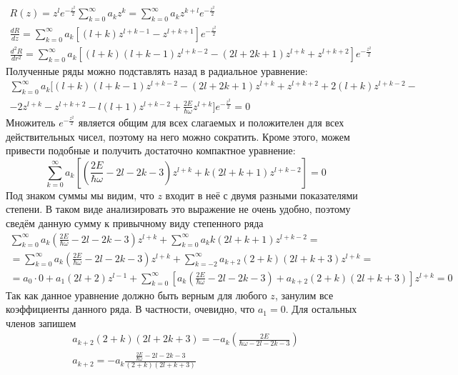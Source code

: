 \begin{gather*}
    R(z) = z^l e^{-\frac{z^2}{2}}\sum_{k=0}^\infty a_k z^k = \sum_{k=0}^\infty a_k z^{k+l} e^{-\frac{z^2}{2}} \\
    \frac{dR}{dz} = \sum_{k=0}^\infty a_k\left[(l+k)z^{l+k-1} - z^{l+k+1}\right]e^{-\frac{z^2}{2}} \\
    \frac{d^2R}{dr^2} = \sum_{k = 0}^\infty a_k \left[(l+k)(l+k-1)z^{l+k-2} - (2l+2k+1)z^{l+k} + z^{l+k+2}\right]e^{-\frac{z^2}{2}}
\end{gather*}
Полученные ряды можно подставлять назад в радиальное уравнение:
\begin{gather*}
    \sum_{k=0}^\infty a_k \biggl[ (l+k)(l+k-1)z^{l+k-2} - (2l+2k+1)z^{l+k}+z^{l+k+2} + 2(l+k)z^{l+k-2} - \\ 
    - 2z^{l+k} - z^{l+k+2} - l(l+1)z^{l+k-2} + \frac{2E}{\hbar\omega} z^{l+k} \biggr] e^{-\frac{z^2}{2}} = 0
\end{gather*}
Множитель $e^{-\frac{z^2}{2}}$ является общим для всех слагаемых и положителен для всех действительных чисел, поэтому на него можно сократить. Кроме этого, можем привести подобные и получить достаточно компактное уравнение:
\[
\sum_{k=0}^\infty a_k \left[\left(\frac{2E}{\hbar\omega} - 2l - 2k - 3\right)z^{l+k} + k(2l+k+1) z^{l+k-2}\right] = 0
\]
Под знаком суммы мы видим, что $z$ входит в неё с двумя разными показателями степени. В таком виде анализировать это выражение не очень удобно, поэтому сведём данную сумму к привычному виду степенного ряда
\begin{gather*}
    \sum_{k=0}^\infty a_k\left(\frac{2E}{\hbar\omega} - 2l - 2k -3\right)z^{l+k} + \sum_{k=0}^\infty a_k k(2l+k+1)z^{l+k-2} = \\
    = \sum_{k=0}^\infty a_k\left(\frac{2E}{\hbar\omega} - 2l - 2k -3\right)z^{l+k} + \sum_{k=-2}^\infty a_{k+2}(2+k)(2l+k+3)z^{l+k} = \\
    = a_0\cdot0 + a_1(2l+2)z^{l-1} + \sum_{k=0}^\infty \left[a_k\left(\frac{2E}{\hbar\omega} - 2l - 2k - 3\right) + a_{k+2}(2+k)(2l+k+3)\right]z^{l+k} = 0
\end{gather*}
Так как данное уравнение должно быть верным для любого $z$, занулим все коэффициенты данного ряда. В частности, очевидно, что $a_1 = 0$. Для остальных членов запишем
\begin{gather*}
    a_{k+2}(2+k)(2l+2k+3) = -a_k\left(\frac{2E}{\hbar\omega-2l-2k-3}\right) \\
    a_{k+2} = -a_k\frac{\frac{2E}{\hbar\omega}-2l-2k-3}{(2+k)(2l+k+3)}
\end{gather*}

